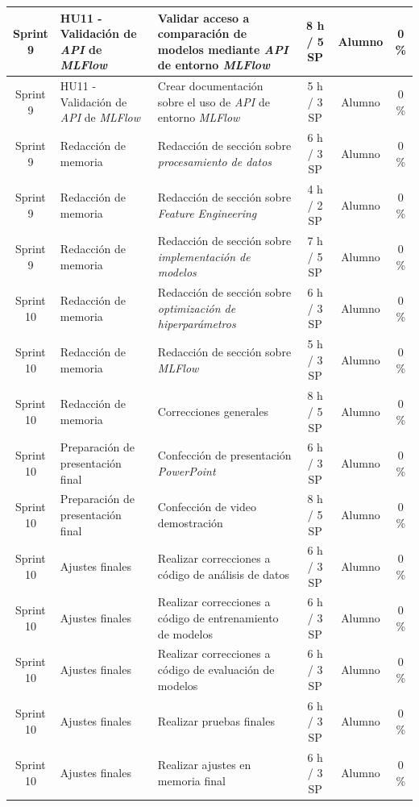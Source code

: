 \documentclass[
11pt, %
]{charter}
\begin{document}
\begin{xltabular}{\linewidth}{@{}|c|X|X|c|c|c|@{}}
Sprint 9 & HU11 - Validación de \textit{API} de \textit{MLFlow} & Validar acceso a comparación de modelos mediante \textit{API} de entorno \textit{MLFlow}  & 8 h / 5 SP & Alumno & 0 \% \\ \hline
Sprint 9 & HU11 - Validación de \textit{API} de \textit{MLFlow} & Crear documentación sobre el uso de \textit{API} de entorno \textit{MLFlow}  & 5 h / 3 SP & Alumno & 0 \% \\ \hline
Sprint 9 & Redacción de memoria  & Redacción de sección sobre \textit{procesamiento de datos}  & 6 h / 3 SP & Alumno & 0 \% \\ \hline
Sprint 9 & Redacción de memoria  & Redacción de sección sobre \textit{Feature Engineering}  & 4 h / 2 SP & Alumno & 0 \% \\ \hline
Sprint 9 & Redacción de memoria  & Redacción de sección sobre \textit{implementación de modelos}  & 7 h / 5 SP & Alumno & 0 \% \\ \hline
Sprint 10 & Redacción de memoria  & Redacción de sección sobre \textit{optimización de hiperparámetros}  & 6 h / 3 SP & Alumno & 0 \% \\ \hline
Sprint 10 & Redacción de memoria  & Redacción de sección sobre \textit{MLFlow}  & 5 h / 3 SP & Alumno & 0 \% \\ \hline
Sprint 10 & Redacción de memoria  & Correcciones generales  & 8 h / 5 SP & Alumno & 0 \% \\ \hline
Sprint 10 & Preparación de presentación final  & Confección de presentación \textit{PowerPoint}  & 6 h / 3 SP & Alumno & 0 \%\\ \hline
Sprint 10 & Preparación de presentación final  & Confección de video demostración  & 8 h / 5 SP & Alumno & 0 \%\\ \hline
Sprint 10 & Ajustes finales & Realizar correcciones a código de análisis de datos & 6 h / 3 SP & Alumno & 0 \%\\ \hline
Sprint 10 & Ajustes finales & Realizar correcciones a código de entrenamiento de modelos & 6 h / 3 SP & Alumno & 0 \%\\ \hline
Sprint 10 & Ajustes finales & Realizar correcciones a código de evaluación de modelos & 6 h / 3 SP & Alumno & 0 \%\\ \hline
Sprint 10 & Ajustes finales & Realizar pruebas finales & 6 h / 3 SP & Alumno & 0 \%\\ \hline
Sprint 10 & Ajustes finales & Realizar ajustes en memoria final & 6 h / 3 SP & Alumno & 0 \%\\ \hline
\end{xltabular}
\end{document}
